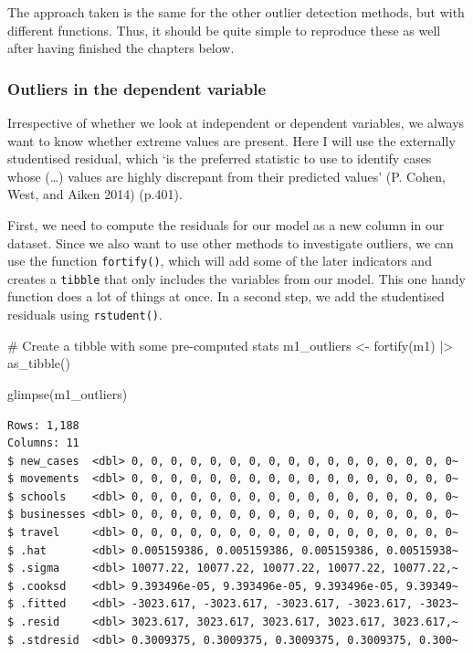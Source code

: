 \documentclass[
  letterpaper,
  DIV=11,
  numbers=noendperiod]{scrreprt}
\newenvironment{Shaded}{\begin{snugshade}}{\end{snugshade}}
\newcommand{\CommentTok}[1]{\textcolor[rgb]{0.37,0.37,0.37}{#1}}
\newcommand{\FunctionTok}[1]{\textcolor[rgb]{0.28,0.35,0.67}{#1}}
\newcommand{\NormalTok}[1]{\textcolor[rgb]{0.00,0.23,0.31}{#1}}
\newcommand{\OtherTok}[1]{\textcolor[rgb]{0.00,0.23,0.31}{#1}}
\newcommand{\SpecialCharTok}[1]{\textcolor[rgb]{0.37,0.37,0.37}{#1}}
\begin{document}
The approach taken is the same for the other outlier detection methods,
but with different functions. Thus, it should be quite simple to
reproduce these as well after having finished the chapters below.

\subsubsection{Outliers in the dependent
variable}\label{sec-outliers-in-the-dependent-variable}

Irrespective of whether we look at independent or dependent variables,
we always want to know whether extreme values are present. Here I will
use the externally studentised residual, which `is the preferred
statistic to use to identify cases whose (\ldots) values are highly
discrepant from their predicted values' (P. Cohen, West, and Aiken 2014)
(p.401).

First, we need to compute the residuals for our model as a new column in
our dataset. Since we also want to use other methods to investigate
outliers, we can use the function \texttt{fortify()}, which will add
some of the later indicators and creates a \texttt{tibble} that only
includes the variables from our model. This one handy function does a
lot of things at once. In a second step, we add the studentised
residuals using \texttt{rstudent()}.

\begin{Shaded}
\begin{Highlighting}[]
\CommentTok{\# Create a tibble with some pre{-}computed stats}
\NormalTok{m1\_outliers }\OtherTok{\textless{}{-}}
  \FunctionTok{fortify}\NormalTok{(m1) }\SpecialCharTok{|\textgreater{}}
  \FunctionTok{as\_tibble}\NormalTok{()}

\FunctionTok{glimpse}\NormalTok{(m1\_outliers)}
\end{Highlighting}
\end{Shaded}

\begin{verbatim}
Rows: 1,188
Columns: 11
$ new_cases  <dbl> 0, 0, 0, 0, 0, 0, 0, 0, 0, 0, 0, 0, 0, 0, 0, 0, 0~
$ movements  <dbl> 0, 0, 0, 0, 0, 0, 0, 0, 0, 0, 0, 0, 0, 0, 0, 0, 0~
$ schools    <dbl> 0, 0, 0, 0, 0, 0, 0, 0, 0, 0, 0, 0, 0, 0, 0, 0, 0~
$ businesses <dbl> 0, 0, 0, 0, 0, 0, 0, 0, 0, 0, 0, 0, 0, 0, 0, 0, 0~
$ travel     <dbl> 0, 0, 0, 0, 0, 0, 0, 0, 0, 0, 0, 0, 0, 0, 0, 0, 0~
$ .hat       <dbl> 0.005159386, 0.005159386, 0.005159386, 0.00515938~
$ .sigma     <dbl> 10077.22, 10077.22, 10077.22, 10077.22, 10077.22,~
$ .cooksd    <dbl> 9.393496e-05, 9.393496e-05, 9.393496e-05, 9.39349~
$ .fitted    <dbl> -3023.617, -3023.617, -3023.617, -3023.617, -3023~
$ .resid     <dbl> 3023.617, 3023.617, 3023.617, 3023.617, 3023.617,~
$ .stdresid  <dbl> 0.3009375, 0.3009375, 0.3009375, 0.3009375, 0.300~
\end{verbatim}
\end{document}
